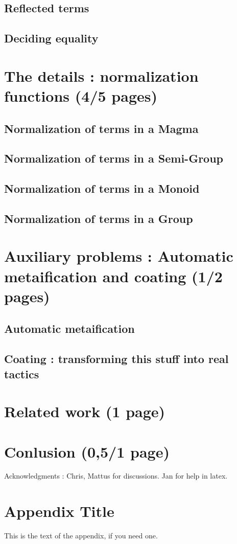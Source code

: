 \documentclass{sigplanconf}
\begin{document}
	\subsection {Reflected terms}

	\subsection {Deciding equality}

\section {The details : normalization functions (4/5 pages)}

	\subsection {Normalization of terms in a Magma}

	\subsection {Normalization of terms in a Semi-Group}

	\subsection {Normalization of terms in a Monoid}

	\subsection {Normalization of terms in a Group}

\section {Auxiliary problems : Automatic metaification and coating (1/2 pages)}

	\subsection {Automatic metaification}

	\subsection {Coating : transforming this stuff into real tactics}

\section {Related work (1 page)}

\section {Conlusion (0,5/1 page)}


\acks

Acknowledgments : Chris, Mattus for discussions. Jan for help in latex.





\appendix
\section{Appendix Title}

This is the text of the appendix, if you need one.
\end{document}

